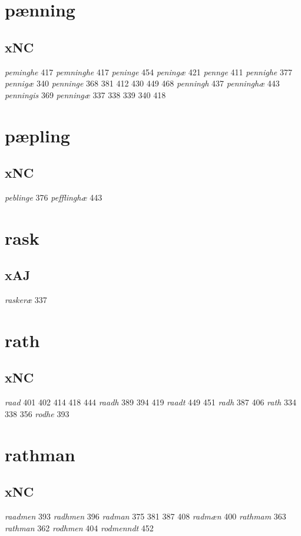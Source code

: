 \documentclass[a4paper,twocolumn]{article}
\begin{document}
\section{pænning}
\label{sec:orgba99d2e}
\subsection{xNC}
\label{sec:org9c1c786}
\emph{peminghe} 417 \emph{pemninghe} 417 \emph{peninge} 454 \emph{peningæ} 421 \emph{pennge} 411 \emph{pennighe} 377 \emph{pennigæ} 340 \emph{penninge} 368 381 412 430 449 468 \emph{penningh} 437 \emph{penninghæ} 443 \emph{penningis} 369 \emph{penningæ} 337 338 339 340 418 
\section{pæpling}
\label{sec:orgaa2c725}
\subsection{xNC}
\label{sec:orgfb5ab81}
\emph{peblinge} 376 \emph{pefflinghæ} 443 
\section{rask}
\label{sec:org1ad0e97}
\subsection{xAJ}
\label{sec:org8da981e}
\emph{raskeræ} 337 
\section{rath}
\label{sec:org7ce98c8}
\subsection{xNC}
\label{sec:org8352f2f}
\emph{raad} 401 402 414 418 444 \emph{raadh} 389 394 419 \emph{raadt} 449 451 \emph{radh} 387 406 \emph{rath} 334 338 356 \emph{rodhe} 393 
\section{rathman}
\label{sec:org937eda2}
\subsection{xNC}
\label{sec:org680987d}
\emph{raadmen} 393 \emph{radhmen} 396 \emph{radman} 375 381 387 408 \emph{radmæn} 400 \emph{rathmam} 363 \emph{rathman} 362 \emph{rodhmen} 404 \emph{rodmenndt} 452 
\end{document}
